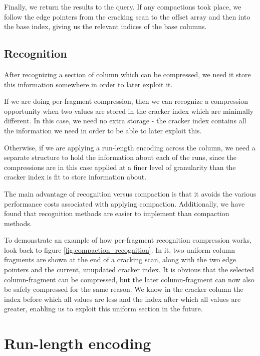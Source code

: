 Finally, we return the results to the query. If any compactions took place, we follow the edge pointers from the cracking scan to the offset array and then into the base index, giving us the relevant indices of the base columns.

\subsection{Recognition}

After recognizing a section of column which can be compressed, we need it store this information somewhere in order to later exploit it.

If we are doing per-fragment compression, then we can recognize a compression opportunity when two values are stored in the cracker index which are minimally different. In this case, we need no extra storage - the cracker index contains all the information we need in order to be able to later exploit this.

Otherwise, if we are applying a run-length encoding across the column, we need a separate structure to hold the information about each of the runs, since the compressions are in this case applied at a finer level of granularity than the cracker index is fit to store information about.

The main advantage of recognition versus compaction is that it avoids the various performance costs associated with applying compaction. Additionally, we have found that recognition methods are easier to implement than compaction methods.

To demonstrate an example of how per-fragment recognition compression works, look back to figure \ref{fig:compaction_recognition}. In it, two uniform column fragments are shown at the end of a cracking scan, along with the two edge pointers and the current, unupdated cracker index. It is obvious that the selected column-fragment can be compressed, but the later column-fragment can now also be safely compressed for the same reason. We know in the cracker column the index before which all values are less and the index after which all values are greater, enabling us to exploit this uniform section in the future.

\section{Run-length encoding}

